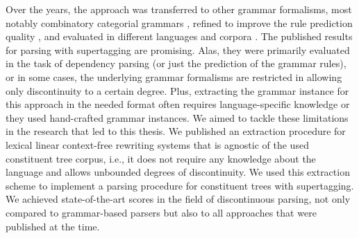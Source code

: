 \documentclass[../document.tex]{subfiles}
\begin{document}
    Over the years, the approach was transferred to other grammar formalisms, most notably combinatory categorial grammars \citep{Clark04}, refined to improve the rule prediction quality \citep{vaswani2016supertagging,Kad18,tian20}, and evaluated in different languages and corpora \citep{Bla18}.
    The published results for parsing with supertagging are promising.
    Alas, they were primarily evaluated in the task of dependency parsing (or just the prediction of the grammar rules), or in some cases, the underlying grammar formalisms are restricted in allowing only discontinuity to a certain degree.
    Plus, extracting the grammar instance for this approach in the needed format often requires language-specific knowledge \citep{Kas17,Bla18} or they used hand-crafted grammar instances. \citep{Hoc07}
    We aimed to tackle these limitations in the research that led to this thesis.
    We published an extraction procedure for lexical linear context-free rewriting systems that is agnostic of the used constituent tree corpus, i.e.\@, it does not require any knowledge about the language and allows unbounded degrees of discontinuity. \citep{MoeRup20}
    We used this extraction scheme to implement a parsing procedure for constituent trees with supertagging. We achieved state-of-the-art scores in the field of discontinuous parsing, not only compared to grammar-based parsers but also to all approaches that were published at the time. \citep{RupMoe21,Rup22}
    
\end{document}
